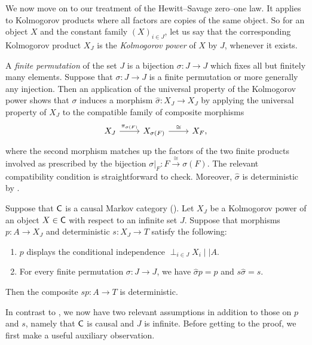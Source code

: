 \documentclass[11pt]{article}
\begin{document}
We now move on to our treatment of the Hewitt--Savage zero--one law. It applies to Kolmogorov products where all factors are copies of the same object. So for an object $X$ and the constant family $(X)_{i \in J}$, let us say that the corresponding Kolmogorov product $X_J$ is the \emph{Kolmogorov power} of $X$ by $J$, whenever it exists.

A \emph{finite permutation} of the set $J$ is a bijection $\sigma : J \to J$ which fixes all but finitely many elements. Suppose that $\sigma : J \to J$ is a finite permutation or more generally any injection. Then an application of the universal property of the Kolmogorov power shows that $\sigma$ induces a morphism $\hat{\sigma} : X_J \to X_J$ by applying the universal property of $X_J$ to the compatible family of composite morphisms
\[
	\begin{tikzcd}
		X_J \ar{r}{\pi_{\sigma(F)}} & X_{\sigma(F)} \ar{r}{\cong} & X_{F},
	\end{tikzcd}
\]
where the second morphism matches up the factors of the two finite products involved as prescribed by the bijection $\sigma|_F : F \stackrel{\cong}{\longrightarrow} \sigma(F)$. The relevant compatibility condition is straightforward to check. Moreover, $\hat{\sigma}$ is deterministic by .


\begin{theorem}
    	\label{thm:hewsav}
	Suppose that $\mathsf{C}$ is a causal Markov category (). Let $X_J$ be a Kolmogorov power of an object $X \in \mathsf{C}$ with respect to an infinite set $J$.
    	Suppose that morphisms $p: A \to X_J$ and deterministic $s : X_J \to T$ satisfy the following:
    	\begin{enumerate}
		\item $p$ displays the conditional independence $\perp_{i \in J} X_i \mid\mid A$.
		\item For every finite permutation $\sigma : J \to J$, we have $\hat{\sigma} p = p$ and $s \hat{\sigma} = s$. 
    	\end{enumerate}
	Then the composite $sp : A \to T$ is deterministic.
\end{theorem}

In contrast to , we now have two relevant assumptions in addition to those on $p$ and $s$, namely that $\mathsf{C}$ is causal and $J$ is infinite. Before getting to the proof, we first make a useful auxiliary observation.
\end{document}

